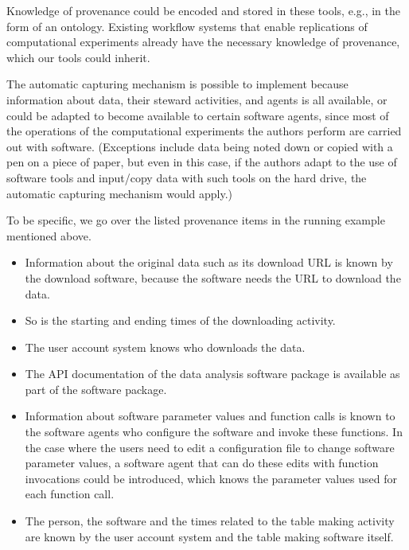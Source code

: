 Knowledge of provenance could be encoded and stored in these tools, e.g., in the form of an ontology. 
Existing workflow systems that enable replications of computational experiments already have the 
necessary knowledge of provenance, which our tools could inherit.

The automatic capturing mechanism is possible to implement because information about data, their steward 
activities, and agents is all available, or could be adapted to become available to certain software 
agents, since most of the operations of the computational experiments the authors perform are carried 
out with software. (Exceptions include data being noted down or copied with a pen on a piece of paper, 
but even in this case, if the authors adapt to the use of software tools and input/copy data with such 
tools on the hard drive, the automatic capturing mechanism would apply.)

To be specific, we go over the 
listed provenance items in the running example mentioned above. 
\begin{itemize}
\item Information about the original data such as its download URL is known by the download software, 
because the software needs the URL to download the data. 
\item So is the starting and ending times of the downloading activity. 
\item The user account system knows who downloads the data. 
\item The API documentation of the data analysis software package is available as part of the software 
package. 
\item Information about software parameter values and function calls is known to the software agents who 
configure the software and invoke these functions. In the case where the users need to edit a 
configuration file to change software parameter values, a software agent that can do these edits with 
function invocations could be introduced, which knows the parameter values used for each function call.
\item The person, the software and the times related to the table making activity are known by the user 
account system and the table making software itself.
\end{itemize}

